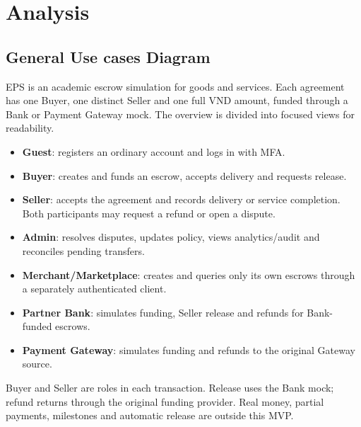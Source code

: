 \chapter{Analysis}
\section{General Use cases Diagram}
EPS is an academic escrow simulation for goods and services. Each agreement has one Buyer, one distinct Seller and one full VND amount, funded through a Bank or Payment Gateway mock. The overview is divided into focused views for readability.

\begin{itemize}
\item \textbf{Guest}: registers an ordinary account and logs in with MFA.
\item \textbf{Buyer}: creates and funds an escrow, accepts delivery and requests release.
\item \textbf{Seller}: accepts the agreement and records delivery or service completion. Both participants may request a refund or open a dispute.
\item \textbf{Admin}: resolves disputes, updates policy, views analytics/audit and reconciles pending transfers.
\item \textbf{Merchant/Marketplace}: creates and queries only its own escrows through a separately authenticated client.
\item \textbf{Partner Bank}: simulates funding, Seller release and refunds for Bank-funded escrows.
\item \textbf{Payment Gateway}: simulates funding and refunds to the original Gateway source.
\end{itemize}
Buyer and Seller are roles in each transaction. Release uses the Bank mock; refund returns through the original funding provider. Real money, partial payments, milestones and automatic release are outside this MVP.

